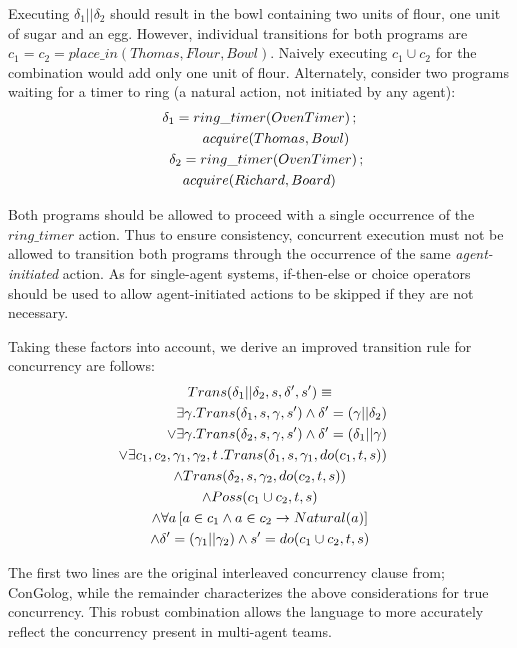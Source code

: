 \documentclass[letterpaper]{article}
\begin{document}
Executing $\delta_{1}||\delta_{2}$ should result in the bowl containing
two units of flour, one unit of sugar and an egg. However, individual
transitions for both programs are $c_{1}=c_{2}=place\_ in(Thomas,Flour,Bowl)$.
Naively executing $c_1 \cup c_2$ for the combination would add only one unit
of flour. Alternately, consider two programs
waiting for a timer to ring (a natural action, not initiated by any agent):
\begin{multline}
\delta_{1}=ring\_ timer(OvenTimer)\,;\\
   \shoveright{acquire(Thomas,Bowl)}\\
\shoveleft{\delta_{2}=ring\_ timer(OvenTimer)\,;}\\
    acquire(Richard,Board)
\end{multline}

Both programs should be allowed to proceed with a single occurrence
of the $ring\_ timer$ action. Thus to ensure consistency, 
concurrent execution must not be allowed
to transition both programs through the occurrence of the same
\emph{agent-initiated} action.  As for single-agent systems, if-then-else or
choice operators should be used to allow agent-initiated actions to be
skipped if they are not necessary.

Taking these factors into account, we derive an improved transition
rule for concurrency are follows:
\begin{multline}
\label{eqn:trans_conc_new}
Trans(\delta_{1}||\delta_{2},s,\delta',s')\equiv\\
\shoveright{\exists\gamma. Trans(\delta_{1},s,\gamma,s')\wedge \delta'=(\gamma||\delta_2)}\\
\shoveright{\vee\exists\gamma. Trans(\delta_{2},s,\gamma,s')\wedge \delta'=(\delta_1 || \gamma)}\\
\shoveright{\vee\exists c_{1},c_{2},\gamma_{1},\gamma_{2},t\,.Trans(\delta_{1},s,\gamma_{1},do(c_{1},t,s))}\\
\wedge Trans(\delta_{2},s,\gamma_{2},do(c_{2},t,s))\\
\wedge Poss(c_{1}\cup c_{2},t,s)\\
\wedge\forall a\left[a\in c_{1}\wedge a\in c_{2}\rightarrow Natural(a)\right]\\
\wedge\delta'=(\gamma_{1}||\gamma_{2})\wedge s'=do(c_{1}\cup c_{2},t,s)
\end{multline}

The first two lines are the original interleaved concurrency clause from;
ConGolog, while the remainder
characterizes the above considerations for true concurrency.
This robust combination allows
the language to more accurately reflect the concurrency present in
multi-agent teams.
\end{document}
